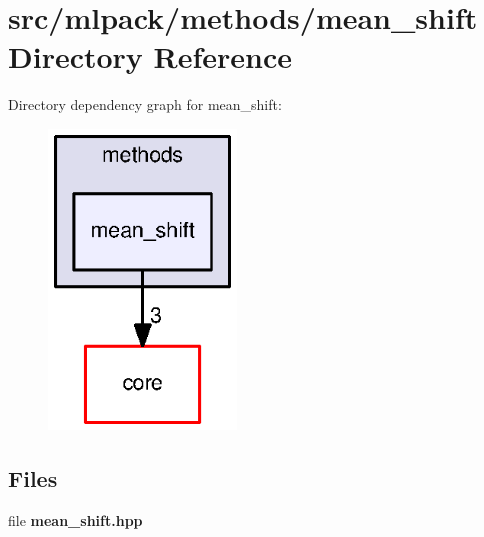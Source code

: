 \section{src/mlpack/methods/mean\+\_\+shift Directory Reference}
\label{dir_bea58545a892a685c577b438a573964d}
Directory dependency graph for mean\+\_\+shift\+:
\nopagebreak
\begin{figure}[H]
\begin{center}
\leavevmode
\includegraphics[width=142pt]{dir_bea58545a892a685c577b438a573964d_dep}
\end{center}
\end{figure}
\subsection*{Files}
\begin{DoxyCompactItemize}
\item 
file {\bf mean\+\_\+shift.\+hpp}
\end{DoxyCompactItemize}
